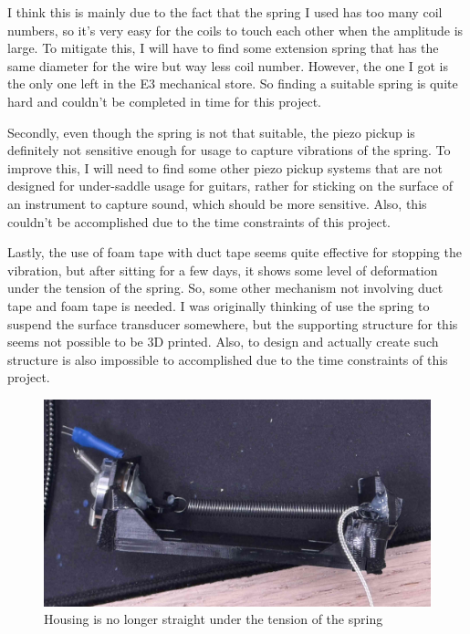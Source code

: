 \documentclass[11pt,a4paper]{article}
\begin{document}
I think this is mainly due to the fact that the spring I used has too many coil numbers, so it's very easy for the coils to touch each other when the amplitude is large. To mitigate this, I will have to find some extension spring that has the same diameter for the wire but way less coil number. However, the one I got is the only one left in the E3 mechanical store. So finding a suitable spring is quite hard and couldn't be completed in time for this project. 

Secondly, even though the spring is not that suitable, the piezo pickup is definitely not sensitive enough for usage to capture vibrations of the spring. To improve this, I will need to find some other piezo pickup systems that are not designed for under-saddle usage for guitars, rather for sticking on the surface of an instrument to capture sound, which should be more sensitive. Also, this couldn't be accomplished due to the time constraints of this project. 

Lastly, the use of foam tape with duct tape seems quite effective for stopping the vibration, but after sitting for a few days, it shows some level of deformation under the tension of the spring. So, some other mechanism not involving duct tape and foam tape is needed. I was originally thinking of use the spring to suspend the surface transducer somewhere, but the supporting structure for this seems not possible to be 3D printed. Also, to design and actually create such structure is also impossible to accomplished due to the time constraints of this project.

\begin{figure}[h] 
	\center 
	\includegraphics[width=0.5\linewidth]{photos/deformation.jpg} 
	\caption{Housing is no longer straight under the tension of the spring} 
\end{figure} 
\end{document}

